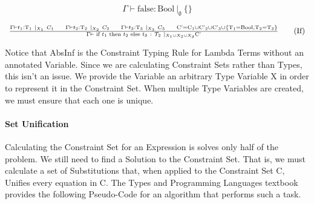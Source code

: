 \documentclass{article}
\begin{document}
\begin{equation}
    \Gamma \vdash \text{false} : \text{Bool} \ |_{\emptyset} \ \{\}
    \tag{False}
\end{equation}

\begin{equation}
\begin{array}{rcl}
    \frac{\Gamma \vdash t_{1} : \text{T}_{1} \ |_{X_{1}} \ C_{1} \indent \Gamma \vdash t_{2} : \text{T}_{2} \ |_{X_{2}} \ C_{2} \indent \Gamma \vdash t_{3} : \text{T}_{3} \ |_{X_{3}} \ C_{3} \indent
     \text{C'} = \text{C}_{1} \cup \text{C'}_{2} \cup \text{C'}_{3} \cup \{\text{T}_{1} = \text{Bool}, \text{T}_{2} = \text{T}_{3}\}}
    {\Gamma \vdash \text{ if } t_{1} \text{ then } t_{2} \text{ else } t_{3} \ : \ T_{2} \ |_{X_{1} \cup X_{2} \cup X_{3}} \text{C'}}
    \tag{If}
\end{array}
\end{equation}

Notice that AbsInf is the Constraint Typing Rule for Lambda Terms without an annotated Variable. Since we are calculating Constraint Sets rather than Types, this isn't an issue. We provide the Variable an arbitrary Type Variable X in order to represent it in the Constraint Set. When multiple Type Variables are created, we must ensure that each one is unique.

\paragraph{Set Unification}

Calculating the Constraint Set for an Expression is solves only half of the problem. We still need to find a Solution to the Constraint Set. That is, we must calculate a set of Substitutions that, when applied to the Constraint Set C, Unifies every equation in C. The Types and Programming Languages textbook provides the following Pseudo-Code for an algorithm that performs such a task.
\end{document}
